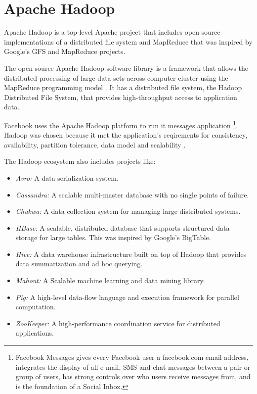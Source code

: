 \documentclass[12pt,a4paper]{report}
\begin{document}
\section{Apache Hadoop}

Apache Hadoop \cite{website:apache-hadoop} is a top-level Apache project that includes open source implementations of a distributed file system \cite{website:apache-hdfs} and MapReduce that was inspired by Google's GFS
\cite{ghemawat2003google} and MapReduce \cite{dean2008mapreduce} projects.

The open source Apache Hadoop software library is a framework that 
allows the distributed processing of large data sets across computer cluster using the MapReduce programming model \cite{website:apache-hadoop}. It has a distributed file system, the Hadoop Distributed File System, that provides 
high-throughput access to application data.

Facebook uses the Apache Hadoop platform to run it messages application \footnote {Facebook Messages gives every 
Facebook user a facebook.com email address, integrates the display of all e-mail, SMS and chat messages between a pair or group of users, has strong controls over who users receive messages from, and is the foundation of a Social Inbox\cite{borthakur2011apache}.}. Hadoop was chosen because it met the application's reqirements for consistency, availability, partition tolerance, data model and scalability \cite{borthakur2011apache}.


The Hadoop ecosystem also includes projects like:\cite{website:apache-hadoop}

\begin{itemize}
\item \emph{Avro:} A data serialization system.
\item \emph{Cassandra:} A scalable multi-master database with no single points of failure.
\item \emph{Chukwa:} A data collection system for managing large distributed systems.
\item \emph{HBase:} A scalable, distributed database that supports structured data storage for large tables. This was inspired by Google's BigTable.
\item \emph{Hive:} A data warehouse infrastructure built on top of Hadoop that provides data summarization and ad hoc querying.
\item \emph{Mahout:} A Scalable machine learning and data mining library.
\item \emph{Pig:} A high-level data-flow language and execution framework for parallel computation.
\item \emph{ZooKeeper:} A high-performance coordination service for distributed applications.
\end{itemize}
\end{document}
